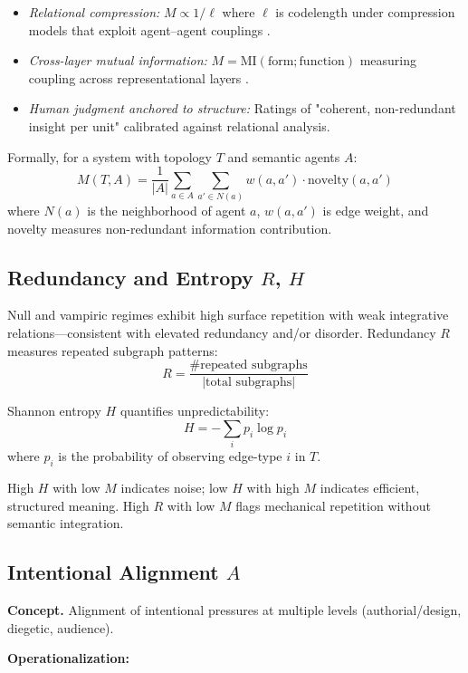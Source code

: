 \documentclass[12pt]{article}
\begin{document}
\begin{itemize}
\item \textit{Relational compression:} $M \propto 1/\ell$ where $\ell$ is codelength under compression models that exploit agent–agent couplings \citep{grunwald2007minimum}.

\item \textit{Cross-layer mutual information:} $M = \text{MI}(\text{form}; \text{function})$ measuring coupling across representational layers \citep{tishby2000information}.

\item \textit{Human judgment anchored to structure:} Ratings of "coherent, non-redundant insight per unit" calibrated against relational analysis.
\end{itemize}

Formally, for a system with topology $T$ and semantic agents $A$:
\[
M(T, A) = \frac{1}{|A|} \sum_{a \in A} \sum_{a' \in N(a)} w(a, a') \cdot \text{novelty}(a, a')
\]
where $N(a)$ is the neighborhood of agent $a$, $w(a, a')$ is edge weight, and novelty measures non-redundant information contribution.

\subsection{Redundancy and Entropy $R$, $H$}

Null and vampiric regimes exhibit high surface repetition with weak integrative relations—consistent with elevated redundancy and/or disorder. Redundancy $R$ measures repeated subgraph patterns:
\[
R = \frac{\text{\# repeated subgraphs}}{|\text{total subgraphs}|}
\]

Shannon entropy $H$ quantifies unpredictability:
\[
H = -\sum_{i} p_i \log p_i
\]
where $p_i$ is the probability of observing edge-type $i$ in $T$.

High $H$ with low $M$ indicates noise; low $H$ with high $M$ indicates efficient, structured meaning. High $R$ with low $M$ flags mechanical repetition without semantic integration.

\subsection{Intentional Alignment $A$}

\textbf{Concept.} Alignment of intentional pressures at multiple levels (authorial/design, diegetic, audience).

\textbf{Operationalization:}
\end{document}
